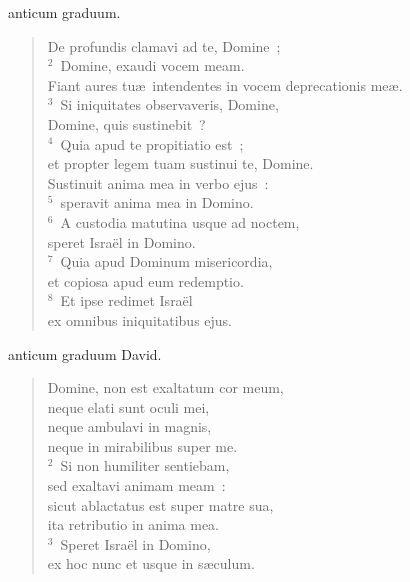 \bchapter
{}anticum graduum. \begin{flushleft}\begin{verse}\vspace{6pt}De profundis clamavi ad te, Domine~;\\
${}^{2}$~Domine, exaudi vocem meam.\\ Fiant aures tu\ae\ intendentes in vocem deprecationis me\ae .\\
${}^{3}$~Si iniquitates observaveris, Domine,\\ Domine, quis sustinebit~?\\
${}^{4}$~Quia apud te propitiatio est~;\\ et propter legem tuam sustinui te, Domine.\\ Sustinuit anima mea in verbo ejus~:\\
${}^{5}$~speravit anima mea in Domino.\\
${}^{6}$~A custodia matutina usque ad noctem,\\ speret Isra\"el in Domino.\\
${}^{7}$~Quia apud Dominum misericordia,\\ et copiosa apud eum redemptio.\\
${}^{8}$~Et ipse redimet Isra\"el\\ ex omnibus iniquitatibus ejus.\end{verse}\end{flushleft}



\bchapter
{}anticum graduum David. \begin{flushleft}\begin{verse}\vspace{6pt}Domine, non est exaltatum cor meum,\\ neque elati sunt oculi mei,\\ neque ambulavi in magnis,\\ neque in mirabilibus super me.\\
${}^{2}$~Si non humiliter sentiebam,\\ sed exaltavi animam meam~:\\ sicut ablactatus est super matre sua,\\ ita retributio in anima mea.\\
${}^{3}$~Speret Isra\"el in Domino,\\ ex hoc nunc et usque in s\ae culum.\end{verse}\end{flushleft}



